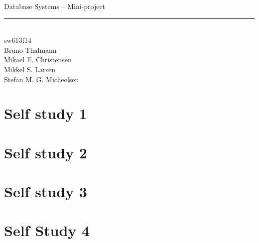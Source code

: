 
\newcommand{\HRule}{\rule{\linewidth}{0.5mm}}


\begin{titlepage}
\centering
{\LARGE Database Systems -- Mini-project}
\HRule \\[0.5cm]
{\Large sw613f14} \\[0.5cm]
Bruno Thalmann\\
Mikael E. Christensen\\
Mikkel S. Larsen\\
Stefan M. G. Micheelsen
\end{titlepage}

\chapter{Self study 1}


\chapter{Self study 2}


\chapter{Self study 3}


\chapter{Self Study 4}


